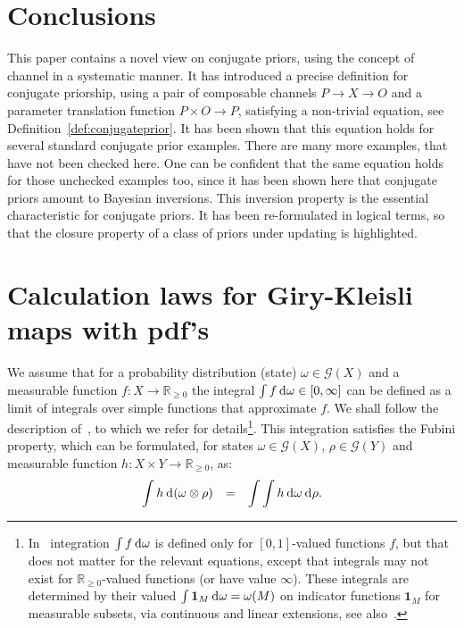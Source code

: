 \documentclass{mscs}
\newcommand{\Giry}{\mathcal{G}}
\newcommand{\R}{\mathbb{R}}
\newcommand{\intd}{{\kern.2em}\mathrm{d}{\kern.03em}}
\newcommand{\indic}[1]{\mathbf{1}_{#1}}
\begin{document}
\section{Conclusions}\label{sec:conclusions}

This paper contains a novel view on conjugate priors, using the
concept of channel in a systematic manner. It has introduced a precise
definition for conjugate priorship, using a pair of composable
channels $P\rightarrow X\rightarrow O$ and a parameter translation
function $P\times O \rightarrow P$, satisfying a non-trivial equation,
see Definition~\ref{def:conjugateprior}. It has been shown that this
equation holds for several standard conjugate prior examples. There
are many more examples, that have not been checked here. One can be
confident that the same equation holds for those unchecked examples
too, since it has been shown here that conjugate priors amount to
Bayesian inversions. This inversion property is the essential
characteristic for conjugate priors. It has been re-formulated in
logical terms, so that the closure property of a class of priors under
updating is highlighted.




\appendix

\section{Calculation laws for Giry-Kleisli maps with 
   pdf's}\label{sec:calculation}

We assume that for a probability distribution (state)
$\omega\in\Giry(X)$ and a measurable function $f\colon X \rightarrow
\R_{\geq 0}$ the integral $\int f \intd \omega \in [0,\infty]$ can be
defined as a limit of integrals over simple functions that approximate
$f$. We shall follow the description of~\cite{Jacobs13a}, to which we
refer for details\footnote{In~\cite{Jacobs13a} integration $\int
  f\intd \omega$ is defined only for $[0,1]$-valued functions $f$, but
  that does not matter for the relevant equations, except that
  integrals may not exist for $\R_{\geq 0}$-valued functions (or have
  value $\infty$). These integrals are determined by their valued
  $\int \indic{M}\intd \omega = \omega(M)$ on indicator functions
  $\indic{M}$ for measurable subsets, via continuous and linear
  extensions, see also~\cite{JacobsW15a}.}.  This integration
satisfies the Fubini property, which can be formulated, for states
$\omega\in\Giry(X)$, $\rho\in\Giry(Y)$ and measurable function
$h\colon X\times Y \rightarrow \R_{\geq 0}$, as:
\begin{equation}
\label{eqn:productpdfintegration}
\begin{array}{rcl}
\displaystyle\int h \intd (\omega\otimes\rho)
& = &
\displaystyle\int \int h \intd \omega \intd\rho.
\end{array}
\end{equation}
\end{document}
